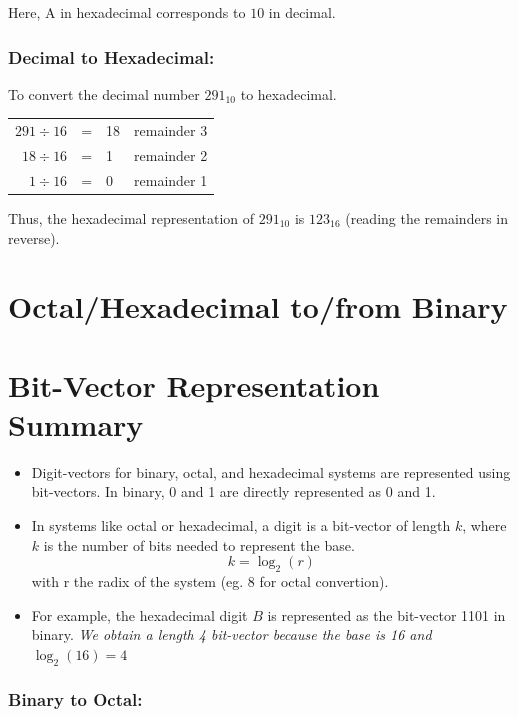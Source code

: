 \documentclass[12pt,openany, tikz,border=10pt]{book}
\begin{document}
	Here, \( \text{A} \) in hexadecimal corresponds to \( 10 \) in decimal.
	
	
	
	    
	
	
	    
	\subsubsection*{Decimal to Hexadecimal:}
	  
	To convert the decimal number \(291_{10}\) to hexadecimal.
	    
	\begin{tabular}{rclr}
		$291 \div 16$ & = & 18 & remainder 3 \\
		$18 \div 16$  & = & 1  & remainder 2 \\
		$1 \div 16$   & = & 0  & remainder 1 \\
	\end{tabular}
	    
	\vspace*{10px}
	Thus, the hexadecimal representation of \(291_{10}\) is \(123_{16}\) (reading the remainders in reverse).
	    
	
	
	\section{Octal/Hexadecimal to/from Binary}
	\section*{Bit-Vector Representation Summary}
	
	\begin{itemize}
		\item Digit-vectors for binary, octal, and hexadecimal systems are represented using bit-vectors. In binary, 0 and 1 are directly represented as 0 and 1.
		\item In systems like octal or hexadecimal, a digit is a bit-vector of length \( k \), where \( k \) is the number of bits needed to represent the base.$$k=\log_{2}(r)$$
		      with r the radix of the system (eg. 8 for octal convertion).
		\item For example, the hexadecimal digit \( B \) is represented as the bit-vector 1101 in binary. \textit{We obtain a length 4 bit-vector because the base is 16 and \( \log_{2}(16) = 4 \)}
	\end{itemize}
	
	\subsubsection*{Binary to Octal:}
	
\end{document}
